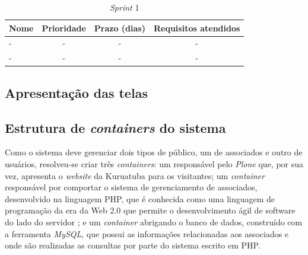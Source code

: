 
\begin{table}[h]
\centering
{}
\caption{\textit{Sprint} 1}
\vspace{0.5cm}
\begin{tabular}{l|c|c|c}
 
\textbf{Nome} & \textbf{Prioridade} & \textbf{Prazo (dias)} & \textbf{Requisitos atendidos}  \\ %
\hline                               %
- & - & - & - \\
- & - & - & - \\
\hline
\end{tabular}
\label{sprint1}
\end{table}

\hspace{2.5cm}
\subsection{Apresentação das telas}
\label{subsec:telas}
\hspace{2.5cm}

\hspace{2.5cm}
\subsection{Estrutura de \textit{containers} do sistema}
\label{subsec:docker}
\hspace{2.5cm}

Como o sistema deve gerenciar dois tipos de público, um de associados e outro de usuários, resolveu-se criar três \textit{containers}: um responsável pelo \textit{Plone} que, por sua vez, apresenta o \textit{website} da Kuruatuba para os visitantes; um \textit{container} responsável por comportar o sistema de gerenciamento de associados, desenvolvido na linguagem PHP, que é conhecida como uma linguagem de programação da era da Web 2.0 que permite o desenvolvimento ágil de software do lado do servidor ; e um \textit{container} abrigando o banco de dados, construído com a ferramenta \textit{MySQL}, que possui as informações relacionadas aos associados e onde são realizadas as consultas por parte do sistema escrito em PHP.

